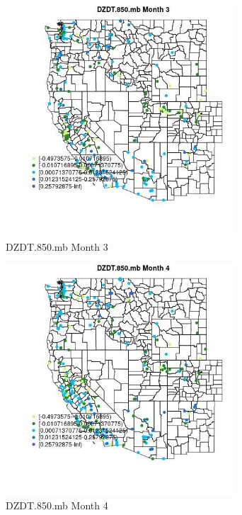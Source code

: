 \begin{figure} 
\centering  
\includegraphics[width=0.77\textwidth]{Code_Outputs/Report_ML_input_PM25_Step4_part_e_de_duplicated_aveswNAs_MapObsMo3DZDT850mb.jpg} 
\caption{\label{fig:Report_ML_input_PM25_Step4_part_e_de_duplicated_aveswNAsMapObsMo3DZDT850mb}DZDT.850.mb Month 3} 
\end{figure} 
 

\begin{figure} 
\centering  
\includegraphics[width=0.77\textwidth]{Code_Outputs/Report_ML_input_PM25_Step4_part_e_de_duplicated_aveswNAs_MapObsMo4DZDT850mb.jpg} 
\caption{\label{fig:Report_ML_input_PM25_Step4_part_e_de_duplicated_aveswNAsMapObsMo4DZDT850mb}DZDT.850.mb Month 4} 
\end{figure} 
 

